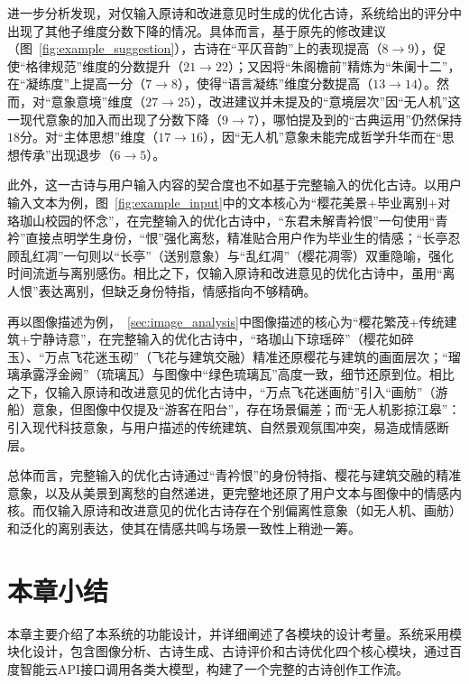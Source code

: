 进一步分析发现，对仅输入原诗和改进意见时生成的优化古诗，系统给出的评分中出现了其他子维度分数下降的情况。具体而言，基于原先的修改建议（图~\ref{fig:example_suggestion}），古诗在“平仄音韵”上的表现提高（$8\rightarrow9$），促使“格律规范”维度的分数提升（$21\rightarrow22$）；又因将“朱阁檐前”精炼为“朱阑十二”，在“凝练度”上提高一分（$7\rightarrow8$），使得“语言凝练”维度分数提高（$13\rightarrow14$）。然而，对“意象意境”维度（$27\rightarrow25$），改进建议并未提及的“意境层次”因“无人机”这一现代意象的加入而出现了分数下降（$9\rightarrow7$），哪怕提及到的“古典运用”仍然保持$18$分。对“主体思想”维度（$17\rightarrow16$），因“无人机”意象未能完成哲学升华而在“思想传承”出现退步（$6\rightarrow5$）。

此外，这一古诗与用户输入内容的契合度也不如基于完整输入的优化古诗。以用户输入文本为例，图~\ref{fig:example_input}中的文本核心为“樱花美景+毕业离别+对珞珈山校园的怀念”，在完整输入的优化古诗中，“东君未解青衿恨”一句使用“青衿”直接点明学生身份，“恨”强化离愁，精准贴合用户作为毕业生的情感；“长亭忍顾乱红凋”一句则以“长亭”（送别意象）与“乱红凋”（樱花凋零）双重隐喻，强化时间流逝与离别感伤。相比之下，仅输入原诗和改进意见的优化古诗中，虽用“离人恨”表达离别，但缺乏身份特指，情感指向不够精确。

再以图像描述为例，~\ref{sec:image_analysis}中图像描述的核心为“樱花繁茂+传统建筑+宁静诗意”，在完整输入的优化古诗中，“珞珈山下琼瑶碎”（樱花如碎玉）、“万点飞花迷玉砌”（飞花与建筑交融）精准还原樱花与建筑的画面层次；“瑠璃承露浮金阙”（琉璃瓦）与图像中“绿色琉璃瓦”高度一致，细节还原到位。相比之下，仅输入原诗和改进意见的优化古诗中，“万点飞花迷画舫”引入“画舫”（游船）意象，但图像中仅提及“游客在阳台”，存在场景偏差；而“无人机影掠江皋”：引入现代科技意象，与用户描述的传统建筑、自然景观氛围冲突，易造成情感断层。%

总体而言，完整输入的优化古诗通过“青衿恨”的身份特指、樱花与建筑交融的精准意象，以及从美景到离愁的自然递进，更完整地还原了用户文本与图像中的情感内核。而仅输入原诗和改进意见的优化古诗存在个别偏离性意象（如无人机、画舫）和泛化的离别表达，使其在情感共鸣与场景一致性上稍逊一筹。


\section{本章小结}

本章主要介绍了本系统的功能设计，并详细阐述了各模块的设计考量。系统采用模块化设计，包含图像分析、古诗生成、古诗评价和古诗优化四个核心模块，通过百度智能云API接口调用各类大模型，构建了一个完整的古诗创作工作流。

